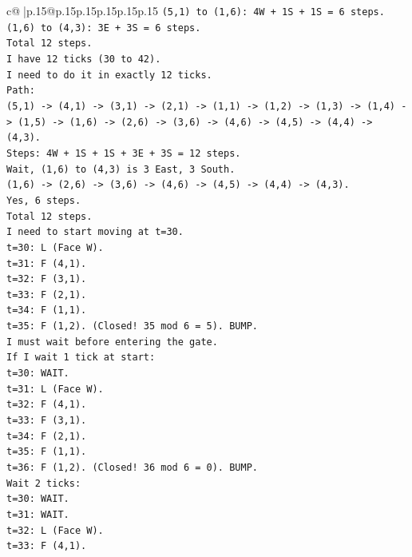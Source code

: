 \documentclass{article}
\begin{document}
{\begin{supertabular}{c@{$\;$}|p{.15\linewidth}@{}p{.15\linewidth}p{.15\linewidth}p{.15\linewidth}p{.15\linewidth}p{.15\linewidth}}
{{{\texttt{(5,1) to (1,6): 4W + 1S + 1S = 6 steps.} \\
\texttt{(1,6) to (4,3): 3E + 3S = 6 steps.} \\
\texttt{Total 12 steps.} \\
\texttt{I have 12 ticks (30 to 42).} \\
\texttt{I need to do it in exactly 12 ticks.} \\
\texttt{Path:} \\
\texttt{(5,1) {-}> (4,1) {-}> (3,1) {-}> (2,1) {-}> (1,1) {-}> (1,2) {-}> (1,3) {-}> (1,4) {-}> (1,5) {-}> (1,6) {-}> (2,6) {-}> (3,6) {-}> (4,6) {-}> (4,5) {-}> (4,4) {-}> (4,3).} \\
\texttt{Steps: 4W + 1S + 1S + 3E + 3S = 12 steps.} \\
\texttt{Wait, (1,6) to (4,3) is 3 East, 3 South.} \\
\texttt{(1,6) {-}> (2,6) {-}> (3,6) {-}> (4,6) {-}> (4,5) {-}> (4,4) {-}> (4,3).} \\
\texttt{Yes, 6 steps.} \\
\texttt{Total 12 steps.} \\
\texttt{I need to start moving at t=30.} \\
\texttt{t=30: L (Face W).} \\
\texttt{t=31: F (4,1).} \\
\texttt{t=32: F (3,1).} \\
\texttt{t=33: F (2,1).} \\
\texttt{t=34: F (1,1).} \\
\texttt{t=35: F (1,2). (Closed! 35 mod 6 = 5). BUMP.} \\
\texttt{I must wait before entering the gate.} \\
\texttt{If I wait 1 tick at start:} \\
\texttt{t=30: WAIT.} \\
\texttt{t=31: L (Face W).} \\
\texttt{t=32: F (4,1).} \\
\texttt{t=33: F (3,1).} \\
\texttt{t=34: F (2,1).} \\
\texttt{t=35: F (1,1).} \\
\texttt{t=36: F (1,2). (Closed! 36 mod 6 = 0). BUMP.} \\
\texttt{Wait 2 ticks:} \\
\texttt{t=30: WAIT.} \\
\texttt{t=31: WAIT.} \\
\texttt{t=32: L (Face W).} \\
\texttt{t=33: F (4,1).} \\
}}}
\end{supertabular}}
\end{document}
